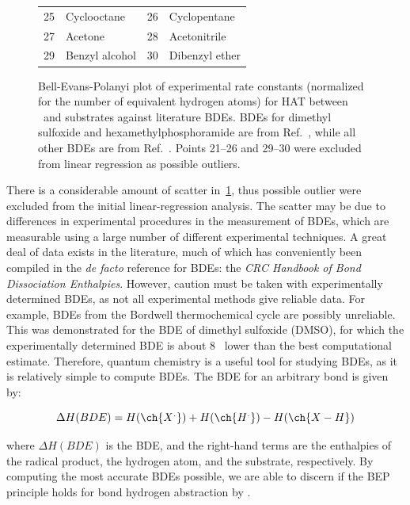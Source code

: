 \begin{figure}[!htbp]
\begin{tabularx}{\textwidth}{| l X l X |}
  25 & Cyclooctane & 26 & Cyclopentane  \\
  27 & Acetone & 28 & Acetonitrile \\
  29 & Benzyl alcohol & 30 & Dibenzyl ether \\
  \hline
\end{tabularx}
  \caption[Bell-Evans-Polanyi plot of experimental rate constants against
  literature BDEs.]{Bell-Evans-Polanyi plot of experimental rate constants
  (normalized for the number of equivalent hydrogen atoms) for HAT between
  \cumo\ and substrates against literature BDEs. BDEs for dimethyl sulfoxide
  and hexamethylphosphoramide are from Ref.~\protect{},
  while all other BDEs are from Ref.~\protect{}. Points 21--26
  and 29--30 were excluded from linear regression as possible outliers.}
  \label{fig:bep-expt}
\end{figure}

There is a considerable amount of scatter in~\ref{fig:bep-expt}, thus possible
outlier were excluded from the initial linear-regression analysis. The scatter
may be due to differences in experimental procedures in the measurement of
BDEs, which are measurable using a large number of different experimental
techniques. A great deal of data exists in the literature, much of which has
conveniently been compiled in the \emph{de facto} reference for BDEs: the
\emph{CRC Handbook of Bond Dissociation Enthalpies}.\cite{Luo2002} However,
caution must be taken with experimentally determined BDEs, as not all
experimental methods give reliable data. For example, BDEs from the
Bordwell\cite{Bordwell1988} thermochemical cycle are possibly
unreliable.\cite{Salamone2012, Miller2016} This was demonstrated for the BDE of
dimethyl sulfoxide (DMSO), for which the experimentally determined BDE is about
8 \kcalmol\ lower than the best computational estimate.\cite{Salamone2012}
Therefore, quantum chemistry is a useful tool for studying BDEs, as it is
relatively simple to compute BDEs. The BDE for an arbitrary  bond is
given by:

\begin{equation}
  \Delta H(BDE) =  H(\ch{X^.}) + H(\ch{H^.}) - H(\ch{X-H})
\end{equation}

\noindent where $\Delta H(BDE)$ is the BDE, and the right-hand terms are the
enthalpies of the radical product, the hydrogen atom, and the substrate,
respectively. By computing the most accurate BDEs possible, we are able to
discern if the BEP principle holds for  bond hydrogen abstraction by
\cumo.

